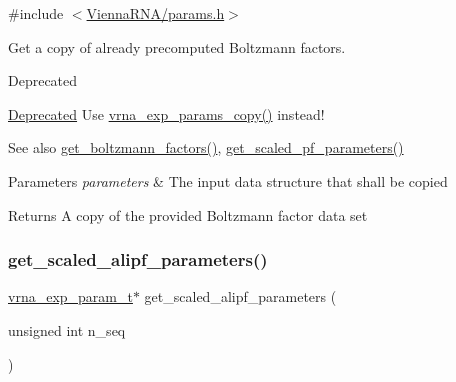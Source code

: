 {\ttfamily \#include $<$\hyperlink{params_8h}{Vienna\+R\+N\+A/params.\+h}$>$}



Get a copy of already precomputed Boltzmann factors. 

\begin{DoxyRefDesc}{Deprecated}
\item[\hyperlink{deprecated__deprecated000096}{Deprecated}]Use \hyperlink{group__energy__parameters_ga70bc46be7cfa5434a71efe241c4f0609}{vrna\+\_\+exp\+\_\+params\+\_\+copy()} instead!\end{DoxyRefDesc}


\begin{DoxySeeAlso}{See also}
\hyperlink{group__energy__parameters_gaef2b931c7e9d4ffb0a5c33df50ec2068}{get\+\_\+boltzmann\+\_\+factors()}, \hyperlink{group__energy__parameters_gabf3b9271c41dd3fac02d56e0b02b3344}{get\+\_\+scaled\+\_\+pf\+\_\+parameters()}
\end{DoxySeeAlso}

\begin{DoxyParams}{Parameters}
{\em parameters} & The input data structure that shall be copied \\
\hline
\end{DoxyParams}
\begin{DoxyReturn}{Returns}
A copy of the provided Boltzmann factor data set 
\end{DoxyReturn}
\mbox{\label{group__energy__parameters_ga0ccf4e1be085a573533fd6b9da2d8cf9}} 
\subsubsection{\texorpdfstring{get\+\_\+scaled\+\_\+alipf\+\_\+parameters()}{get\_scaled\_alipf\_parameters()}}
{\footnotesize\ttfamily \hyperlink{group__energy__parameters_ga01d8b92fe734df8d79a6169482c7d8d8}{vrna\+\_\+exp\+\_\+param\+\_\+t}$\ast$ get\+\_\+scaled\+\_\+alipf\+\_\+parameters (\begin{DoxyParamCaption}\item[{unsigned int}]{n\+\_\+seq }\end{DoxyParamCaption})}



